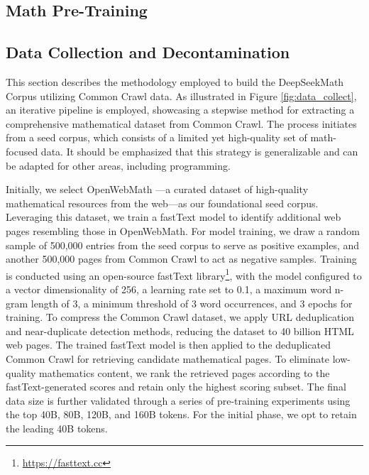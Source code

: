\begin{itemize}[topsep=0pt]
\section{Math Pre-Training}

\subsection{Data Collection and Decontamination} This section describes the methodology employed to build the DeepSeekMath Corpus utilizing Common Crawl data. As illustrated in Figure \ref{fig:data_collect}, an iterative pipeline is employed, showcasing a stepwise method for extracting a comprehensive mathematical dataset from Common Crawl. The process initiates from a seed corpus, which consists of a limited yet high-quality set of math-focused data. It should be emphasized that this strategy is generalizable and can be adapted for other areas, including programming.

Initially, we select OpenWebMath \citep{openwebmath}—a curated dataset of high-quality mathematical resources from the web—as our foundational seed corpus. Leveraging this dataset, we train a fastText model \citep{joulin2016fasttext} to identify additional web pages resembling those in OpenWebMath. For model training, we draw a random sample of 500,000 entries from the seed corpus to serve as positive examples, and another 500,000 pages from Common Crawl to act as negative samples. Training is conducted using an open-source fastText library\footnote{\url{https://fasttext.cc}}, with the model configured to a vector dimensionality of 256, a learning rate set to 0.1, a maximum word n-gram length of 3, a minimum threshold of 3 word occurrences, and 3 epochs for training. To compress the Common Crawl dataset, we apply URL deduplication and near-duplicate detection methods, reducing the dataset to 40 billion HTML web pages. The trained fastText model is then applied to the deduplicated Common Crawl for retrieving candidate mathematical pages. To eliminate low-quality mathematics content, we rank the retrieved pages according to the fastText-generated scores and retain only the highest scoring subset. The final data size is further validated through a series of pre-training experiments using the top 40B, 80B, 120B, and 160B tokens. For the initial phase, we opt to retain the leading 40B tokens.


\end{itemize}
